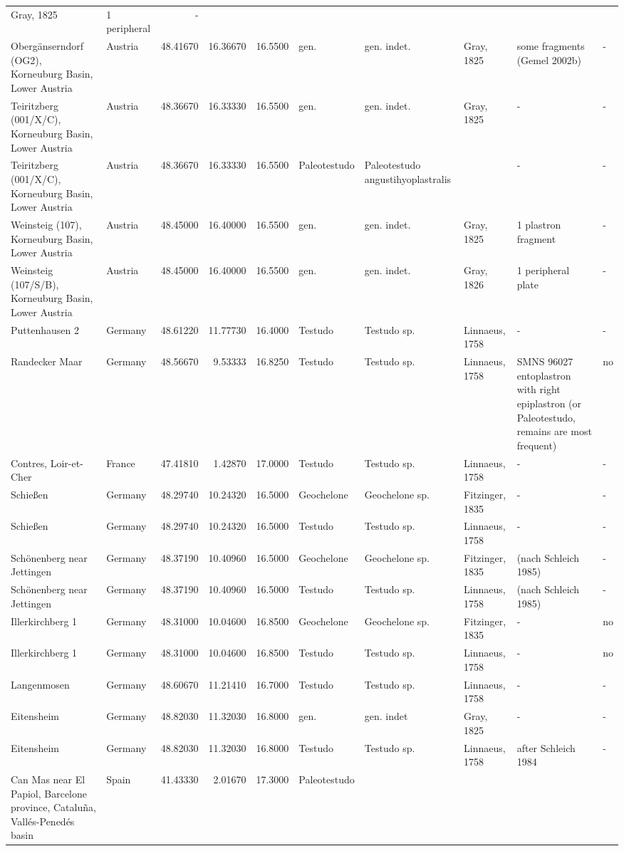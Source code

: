 \documentclass[]{article}
\begin{document}
\begin{longtable}[]{@{}llrrrlllll@{}}
Gray, 1825 & 1 peripheral & -\tabularnewline
Obergänserndorf (OG2), Korneuburg Basin, Lower Austria & Austria &
48.41670 & 16.36670 & 16.5500 & gen. & gen. indet. & Gray, 1825 & some
fragments (Gemel 2002b) & -\tabularnewline
Teiritzberg (001/X/C), Korneuburg Basin, Lower Austria & Austria &
48.36670 & 16.33330 & 16.5500 & gen. & gen. indet. & Gray, 1825 & - &
-\tabularnewline
Teiritzberg (001/X/C), Korneuburg Basin, Lower Austria & Austria &
48.36670 & 16.33330 & 16.5500 & Paleotestudo & Paleotestudo
angustihyoplastralis & & - & -\tabularnewline
Weinsteig (107), Korneuburg Basin, Lower Austria & Austria & 48.45000 &
16.40000 & 16.5500 & gen. & gen. indet. & Gray, 1825 & 1 plastron
fragment & -\tabularnewline
Weinsteig (107/S/B), Korneuburg Basin, Lower Austria & Austria &
48.45000 & 16.40000 & 16.5500 & gen. & gen. indet. & Gray, 1826 & 1
peripheral plate & -\tabularnewline
Puttenhausen 2 & Germany & 48.61220 & 11.77730 & 16.4000 & Testudo &
Testudo sp. & Linnaeus, 1758 & - & -\tabularnewline
Randecker Maar & Germany & 48.56670 & 9.53333 & 16.8250 & Testudo &
Testudo sp. & Linnaeus, 1758 & SMNS 96027 entoplastron with right
epiplastron (or Paleotestudo, remains are most frequent) &
no\tabularnewline
Contres, Loir-et-Cher & France & 47.41810 & 1.42870 & 17.0000 & Testudo
& Testudo sp. & Linnaeus, 1758 & - & -\tabularnewline
Schießen & Germany & 48.29740 & 10.24320 & 16.5000 & Geochelone &
Geochelone sp. & Fitzinger, 1835 & - & -\tabularnewline
Schießen & Germany & 48.29740 & 10.24320 & 16.5000 & Testudo & Testudo
sp. & Linnaeus, 1758 & - & -\tabularnewline
Schönenberg near Jettingen & Germany & 48.37190 & 10.40960 & 16.5000 &
Geochelone & Geochelone sp. & Fitzinger, 1835 & (nach Schleich 1985) &
-\tabularnewline
Schönenberg near Jettingen & Germany & 48.37190 & 10.40960 & 16.5000 &
Testudo & Testudo sp. & Linnaeus, 1758 & (nach Schleich 1985) &
-\tabularnewline
Illerkirchberg 1 & Germany & 48.31000 & 10.04600 & 16.8500 & Geochelone
& Geochelone sp. & Fitzinger, 1835 & - & no\tabularnewline
Illerkirchberg 1 & Germany & 48.31000 & 10.04600 & 16.8500 & Testudo &
Testudo sp. & Linnaeus, 1758 & - & no\tabularnewline
Langenmosen & Germany & 48.60670 & 11.21410 & 16.7000 & Testudo &
Testudo sp. & Linnaeus, 1758 & - & -\tabularnewline
Eitensheim & Germany & 48.82030 & 11.32030 & 16.8000 & gen. & gen. indet
& Gray, 1825 & - & -\tabularnewline
Eitensheim & Germany & 48.82030 & 11.32030 & 16.8000 & Testudo & Testudo
sp. & Linnaeus, 1758 & after Schleich 1984 & -\tabularnewline
Can Mas near El Papiol, Barcelone province, Cataluña, Vallés-Penedés
basin & Spain & 41.43330 & 2.01670 & 17.3000 & Paleotestudo &

\end{longtable}
\end{document}

